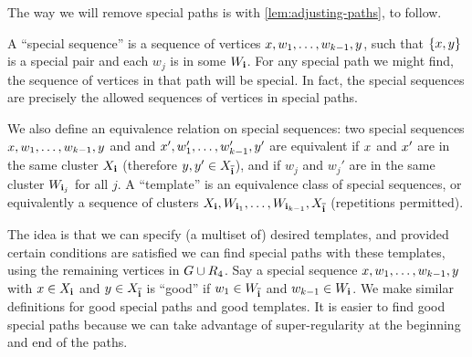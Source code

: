 \documentclass[11pt,english]{article}
\theoremstyle{plain}
\theoremstyle{plain}
\theoremstyle{plain}
\theoremstyle{plain}
\theoremstyle{plain}
\theoremstyle{definition}
\theoremstyle{definition}
\theoremstyle{remark}
\theoremstyle{remark}
\theoremstyle{plain}
\theoremstyle{definition}
\theoremstyle{definition}
\theoremstyle{plain}
\theoremstyle{plain}
\theoremstyle{plain}
\theoremstyle{plain}
\theoremstyle{remark}
\theoremstyle{plain}
\theoremstyle{definition}
\let\originalleft\left
\let\originalright\right
\renewcommand{\left}{\mathopen{}\mathclose\bgroup\originalleft}
\renewcommand{\right}{\aftergroup\egroup\originalright}
\begin{document}
The way we will remove special paths is with \ref{lem:adjusting-paths},
to follow.

A ``special sequence'' is a sequence of vertices $x,w_{1},\dots,w_{k-1},y$,
such that $\left\{ \x,\y\right\} $ is a special pair and each $w_{j}$
is in some $W_{\mathbf{i}}$. For any special path we might find, the sequence
of vertices in that path will be special. In fact, the special sequences
are precisely the allowed sequences of vertices in special paths.

We also define an equivalence relation on special sequences: two special
sequences $x,w_{1},\dots,w_{k-1},y$ and and $x',w_{1}',\dots,w_{k-1}',y'$
are equivalent if $x$ and $x'$ are in the same cluster $X_{\mathbf{i}}$
(therefore $y,y'\in X_{\overline{\mathbf{i}}}$), and if $w_{j}$ and $w_{j}'$
are in the same cluster $W_{\mathbf{i}_{j}}$ for all $j$. A ``template''
is an equivalence class of special sequences, or equivalently a sequence
of clusters $X_{\mathbf{i}},W_{\mathbf{i}_{1}},\dots,W_{\mathbf{i}_{k-1}},X_{\overline{\mathbf{i}}}$
(repetitions permitted).

The idea is that we can specify (a multiset of) desired templates,
and provided certain conditions are satisfied we can find special
paths with these templates, using the remaining vertices in $G\cup R_{4}$.
Say a special sequence $x,w_{1},\dots,w_{k-1},y$ with $x\in X_{\mathbf{i}}$
and $y\in X_{\overline{\mathbf{i}}}$ is ``good'' if $w_{1}\in W_{\overline{\mathbf{i}}}$
and $w_{k-1}\in W_{\mathbf{i}}$. We make similar definitions for good special
paths and good templates. It is easier to find good special paths
because we can take advantage of super-regularity at the beginning
and end of the paths.
\end{document}
